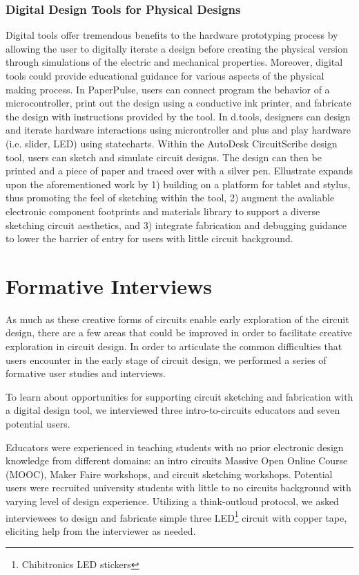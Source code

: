 \documentclass{sigchi}
\begin{document}
\subsubsection{Digital Design Tools for Physical Designs}
Digital tools offer tremendous benefits to the hardware prototyping process by allowing the user to digitally iterate a design before creating the physical version through simulations of the electric and mechanical properties. Moreover, digital tools could provide educational guidance for various aspects of the physical making process. In PaperPulse, users can connect program the behavior of a microcontroller, print out the design using a conductive ink printer, and fabricate the design with instructions provided by the tool. In d.tools, designers can design and iterate hardware interactions using microntroller and plus and play hardware (i.e. slider, LED) using statecharts. Within the AutoDesk CircuitScribe design tool, users can sketch and simulate circuit designs. The design can then be printed and a piece of paper and traced over with a silver pen. Ellustrate expands upon the aforementioned work by 1) building on a platform for tablet and stylus, thus promoting the feel of sketching within the tool, 2) augment the avaliable electronic component footprints and materials library to support a diverse sketching circuit aesthetics, and 3) integrate fabrication and debugging guidance to lower the barrier of entry for users with little circuit background.





\section{Formative Interviews}
As much as these creative forms of circuits enable early exploration of the circuit design, there are a few areas that could be improved in order to facilitate creative exploration in circuit design. In order to articulate the common difficulties that users encounter in the early stage of circuit design, we performed a series of formative user studies and interviews. 

To learn about opportunities for supporting circuit sketching and fabrication with a digital design tool, we interviewed three intro-to-circuits educators and seven potential users. 

Educators were experienced in teaching students with no prior electronic design knowledge from different domains: an intro circuits Massive Open Online Course (MOOC), Maker Faire workshops, and circuit sketching workshops. 
Potential users were recruited university students with little to no circuits background with varying level of design experience. Utilizing a think-outloud protocol, we asked interviewees to design and fabricate simple three LED\footnote{Chibitronics LED stickers} circuit with copper tape, eliciting help from the interviewer as needed. 
\end{document}

